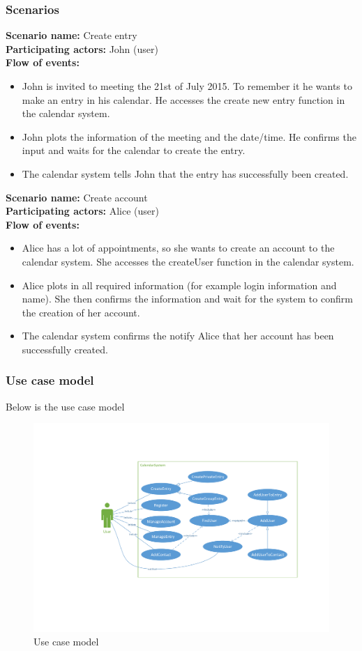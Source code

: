 \subsubsection{Scenarios}
\textbf{Scenario name:} Create entry
\\
\textbf{Participating actors:} John (user)
\\
\textbf{Flow of events:}
\begin{itemize}
\item John is invited to meeting the 21st of July 2015. To remember it he wants to make an entry in his calendar. He accesses the create new entry function in the calendar system.
\item John plots the information of the meeting and the date/time. He confirms the input and waits for the calendar to create the entry.
\item The calendar system tells John that the entry has successfully been created.
\end{itemize}
\textbf{Scenario name:} Create account
\\
\textbf{Participating actors:} Alice (user)
\\
\textbf{Flow of events:}
\begin{itemize}
\item Alice has a lot of appointments, so she wants to create an account to the calendar system. She accesses the createUser function in the calendar system.
\item Alice plots in all required information (for example login information and name). She then confirms the information and wait for the system to confirm the creation of her account.
\item The calendar system confirms the notify Alice that her account has been successfully created.
\end{itemize}
\pagebreak
\subsubsection{Use case model}
Below is the use case model
\begin{figure}[h]
\centering
\includegraphics[scale = 0.8]{usecase}
\caption{Use case model}
\end{figure}
\pagebreak
